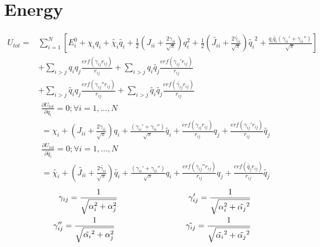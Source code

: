\documentclass[12pt,english]{article}
\begin{document}
	\section{Energy}
	\begin{equation}
	\begin{split}
		U_{tot}  = &\sum_{i=1}^{N} [E_i^0 + \chi_i q_i + \tilde{\chi_i}\tilde{q_i }+ \frac{1}{2}(J_{ii}+\frac{2\gamma_{ii}}{\sqrt{\pi}})q_i^2 + \frac{1}{2}(\tilde{J_{ii}}+\frac{2\tilde{\gamma_{ii}}}{\sqrt{\pi}})\tilde{q_i}^2+\frac{q_i\tilde{q_i }(\gamma_{ii}'+\gamma_{ii}'')}{\sqrt{\pi}}]\\ 
		&+\sum_{i>j} q_iq_j\frac{erf(\gamma_{ij}r_{ij})}{r_{ij}} + \sum_{i>j} q_i\tilde{q_j}\frac{erf(\gamma_{ij}'r_{ij})}{r_{ij}}\\
		 &+\sum_{i>j}\tilde{q_i }q_j \frac{erf(\gamma_{ij}''r_{ij})}{r_{ij}} + \sum_{i>j}\tilde{q_i}\tilde{q_j} \frac{erf(\tilde{\gamma_{ij}}r_{ij})}{r_{ij}}
	\end{split}
	\end{equation}
	\newline
	\begin{equation}
		\begin{split}
			&\frac{\partial U_{tot}}{\partial q_i}=0 ; \forall i = 1 ,...,N \\
			& = \chi_i 
			+ (J_{ii}+\frac{2\gamma_{ii}}{\sqrt{\pi}})q_i 
			+ \frac{(\gamma_{ii}'+ \gamma_{ii}'')}{\sqrt{\pi}}\tilde{q_i} 
			+ \frac{erf(\gamma_{ij}r_{ij})}{r_{ij}}q_j 
			+ \frac{erf(\gamma_{ij}'r_{ij})}{r_{ij}}\tilde{q_j}
		\end{split}
	\end{equation}
	\begin{equation}
		\begin{split}
			&\frac{\partial U_{tot}}{\partial \tilde{q_i}}=0 ; \forall i = 1 ,..., N  \\
			& = \tilde{\chi_i} 
			+ (\tilde{J_{ii}} + \frac{2\tilde{\gamma_{ii}}}{\sqrt{\pi}})\tilde{q_i } 
			+ \frac{(\gamma_{ii}' + \gamma_{ii}'')}{\sqrt{\pi}}q_i 
			+ \frac{erf(\gamma_{ij}''r_{ij})}{r_{ij}}q_j 
			+ \frac{erf(\tilde{q_j}r_{ij})}{r_{ij}}\tilde{q_j}
		\end{split}		
	\end{equation}
	\begin{equation}
	\begin{split}
			\gamma_{ij} = \frac{1}{\sqrt{\alpha_i^2+\alpha_j^2}}
			\hspace{0.25\textwidth} 
			\gamma_{ij}'=\frac{1}{\sqrt{\alpha_i^2+\tilde{\alpha_j}^2}}\\	
			\gamma_{ij}''=\frac{1}{\sqrt{\tilde{\alpha_i}^2+\alpha_j^2}}
			\hspace{0.25\textwidth} 
			\tilde{\gamma_{ij}} = \frac{1}{\sqrt{\tilde{\alpha_i}^2+\tilde{\alpha_j}^2}}
	\end{split}
	\end{equation}
\end{document}
